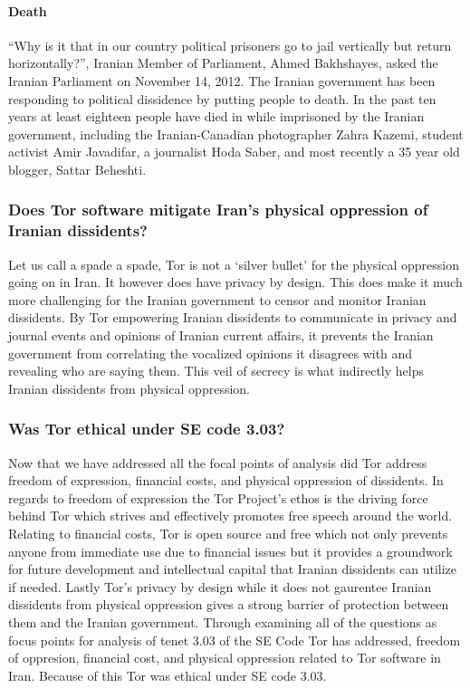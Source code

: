 \documentclass[11pt]{article}
\begin{document}
\begin{multicols}{2}
\paragraph{Death}

``Why is it that in our country political prisoners go to jail vertically but return
horizontally?'', Iranian Member of Parliament, Ahmed Bakhshayes, asked the Iranian Parliament on
November 14, 2012.\cite{IranBloggersDeath} The Iranian government has been
responding to political dissidence by putting people to death. In the past ten
years at least eighteen people have died in while imprisoned by the Iranian
government, including the Iranian-Canadian photographer Zahra Kazemi, student
activist Amir Javadifar, a journalist Hoda Saber, and most recently a 35 year
old blogger, Sattar Beheshti. \cite{IranBloggersDeath}


\subsubsection{Does Tor software mitigate Iran's physical oppression of
Iranian dissidents?}

Let us call a spade a spade, Tor is not a `silver bullet' for the physical
oppression going on in Iran. It however does have privacy by design. This does
make it much more challenging for the Iranian government to censor and monitor
Iranian dissidents. By Tor empowering Iranian dissidents to communicate in
privacy and journal events and opinions of Iranian current affairs, it prevents
the Iranian government from correlating the vocalized opinions it disagrees with
and revealing who are saying them. This veil of secrecy is what indirectly helps
Iranian dissidents from physical oppression.

\subsubsection{Was Tor ethical under SE code 3.03?}

Now that we have addressed all the focal points of analysis did Tor address
freedom of expression, financial costs, and physical oppression of dissidents.
In regards to freedom of expression the Tor Project's ethos is the driving force
behind Tor which strives and effectively promotes free speech around the world.
Relating to financial costs, Tor is open source and free which not only prevents
anyone from immediate use due to financial issues but it provides a groundwork
for future development and intellectual capital that Iranian dissidents can
utilize if needed. Lastly Tor's privacy by design while it does not gaurentee
Iranian dissidents from physical oppression gives a strong barrier of protection
between them and the Iranian government. Through examining all of the questions
as focus points for analysis of tenet 3.03 of the SE Code Tor has addressed,
freedom of oppresion, financial cost, and physical oppression related to Tor
software in Iran. Because of this Tor was ethical under SE code 3.03.


\end{multicols}
\end{document}
